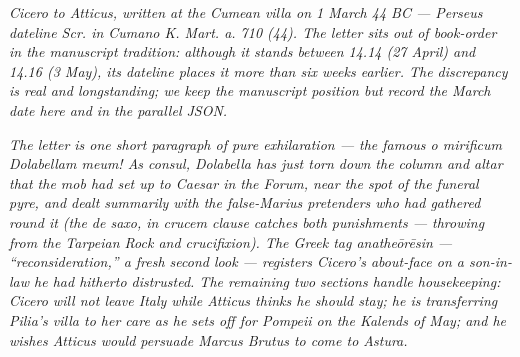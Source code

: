 
\textit{Cicero to Atticus, written at the Cumean villa on 1
March 44 BC --- Perseus dateline \textit{Scr. in Cumano K. Mart.
a. 710 (44)}. The letter sits out of book-order in the
manuscript tradition: although it stands between 14.14 (27 April)
and 14.16 (3 May), its dateline places it more than six weeks
earlier. The discrepancy is real and longstanding; we keep the
manuscript position but record the March date here and in the
parallel JSON.}

\textit{The letter is one short paragraph of pure exhilaration ---
the famous \textit{o mirificum Dolabellam meum!} As consul,
Dolabella has just torn down the column and altar that the mob
had set up to Caesar in the Forum, near the spot of the funeral
pyre, and dealt summarily with the false-Marius pretenders who
had gathered round it (the \textit{de saxo, in crucem} clause
catches both punishments --- throwing from the Tarpeian Rock and
crucifixion). The Greek tag \textit{anathe\=or\=esin} ---
``reconsideration,'' a fresh second look --- registers Cicero's
about-face on a son-in-law he had hitherto distrusted. The
remaining two sections handle housekeeping: Cicero will not
leave Italy while Atticus thinks he should stay; he is
transferring Pilia's villa to her care as he sets off for
Pompeii on the Kalends of May; and he wishes Atticus would
persuade Marcus Brutus to come to Astura.}
